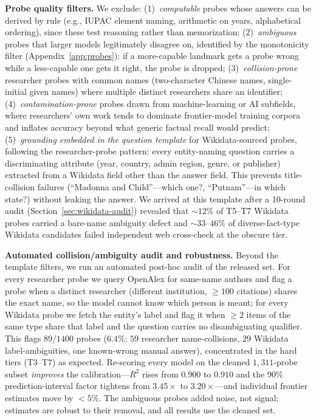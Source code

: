 \documentclass[11pt]{article}
\begin{document}
\textbf{Probe quality filters.} We exclude: (1)~\emph{computable} probes whose answers can be derived by rule (e.g., IUPAC element naming, arithmetic on years, alphabetical ordering), since these test reasoning rather than memorization; (2)~\emph{ambiguous} probes that larger models legitimately disagree on, identified by the monotonicity filter (Appendix~\ref{app:probes}): if a more-capable landmark gets a probe wrong while a less-capable one gets it right, the probe is dropped; (3)~\emph{collision-prone} researcher probes with common names (two-character Chinese names, single-initial given names) where multiple distinct researchers share an identifier; (4)~\emph{contamination-prone} probes drawn from machine-learning or AI subfields, where researchers' own work tends to dominate frontier-model training corpora and inflates accuracy beyond what generic factual recall would predict; (5)~\emph{grounding embedded in the question template} for Wikidata-sourced probes, following the researcher-probe pattern: every entity-naming question carries a discriminating attribute (year, country, admin region, genre, or publisher) extracted from a Wikidata field other than the answer field. This prevents title-collision failures (``Madonna and Child''---which one?, ``Putnam''---in which state?) without leaking the answer. We arrived at this template after a 10-round audit (Section~\ref{sec:wikidata-audit}) revealed that ${\sim}12\%$ of T5--T7 Wikidata probes carried a bare-name ambiguity defect and ${\sim}33$--$46\%$ of diverse-fact-type Wikidata candidates failed independent web cross-check at the obscure tier.

\textbf{Automated collision/ambiguity audit and robustness.} Beyond the template filters, we run an automated post-hoc audit of the released set. For every researcher probe we query OpenAlex for same-name authors and flag a probe when a distinct researcher (different institution, ${\geq}100$ citations) shares the exact name, so the model cannot know which person is meant; for every Wikidata probe we fetch the entity's label and flag it when ${\geq}2$ items of the same type share that label and the question carries no disambiguating qualifier. This flags $89/1400$ probes ($6.4\%$: $59$ researcher name-collisions, $29$ Wikidata label-ambiguities, one known-wrong manual answer), concentrated in the hard tiers (T3--T7) as expected. Re-scoring every model on the cleaned $1{,}311$-probe subset \emph{improves} the calibration---$R^2$ rises from $0.900$ to $0.910$ and the 90\% prediction-interval factor tightens from $3.45\times$ to $3.20\times$---and individual frontier estimates move by ${<}5\%$. The ambiguous probes added noise, not signal; estimates are robust to their removal, and all results use the cleaned set.
\end{document}
